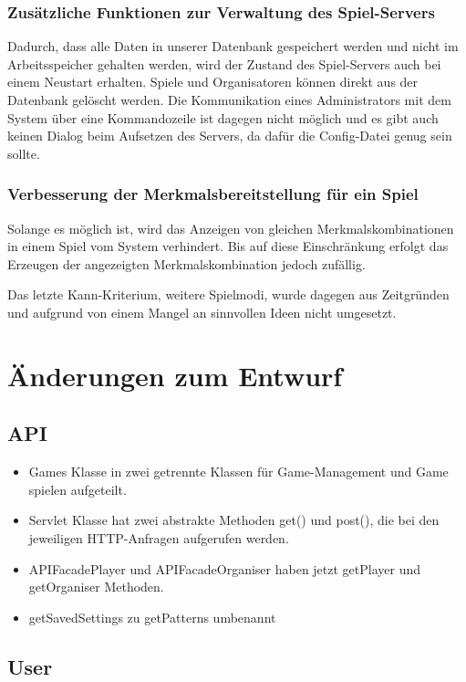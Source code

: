 \documentclass[a4paper]{scrreprt}
\begin{document}
\subsection{Zusätzliche Funktionen zur Verwaltung des Spiel-Servers}
Dadurch, dass alle Daten in unserer Datenbank gespeichert werden und nicht im Arbeitsspeicher gehalten werden, wird der Zustand des Spiel-Servers auch bei einem Neustart erhalten. Spiele und Organisatoren können direkt aus der Datenbank gelöscht werden. Die Kommunikation eines Administrators mit dem System über eine Kommandozeile ist dagegen nicht möglich und es gibt auch keinen Dialog beim Aufsetzen des Servers, da dafür die Config-Datei genug sein sollte.

\subsection{Verbesserung der Merkmalsbereitstellung für ein Spiel}
Solange es möglich ist, wird das Anzeigen von gleichen Merkmalskombinationen in einem Spiel vom System verhindert. Bis auf diese Einschränkung erfolgt das Erzeugen der angezeigten Merkmalskombination jedoch zufällig.



\hspace{1cm}

Das letzte Kann-Kriterium, weitere Spielmodi, wurde dagegen aus Zeitgründen und aufgrund von einem Mangel an sinnvollen Ideen nicht umgesetzt.

\chapter{Änderungen zum Entwurf}
\section{API}
\begin{itemize}
    \item Games Klasse in zwei getrennte Klassen für Game-Management und Game spielen aufgeteilt.
    \item Servlet Klasse hat zwei abstrakte Methoden get() und post(), die bei den jeweiligen HTTP-Anfragen aufgerufen werden.
    \item APIFacadePlayer und APIFacadeOrganiser haben jetzt getPlayer und getOrganiser Methoden.
    \item getSavedSettings zu getPatterns umbenannt
\end{itemize}

\section{User}
\end{document}
